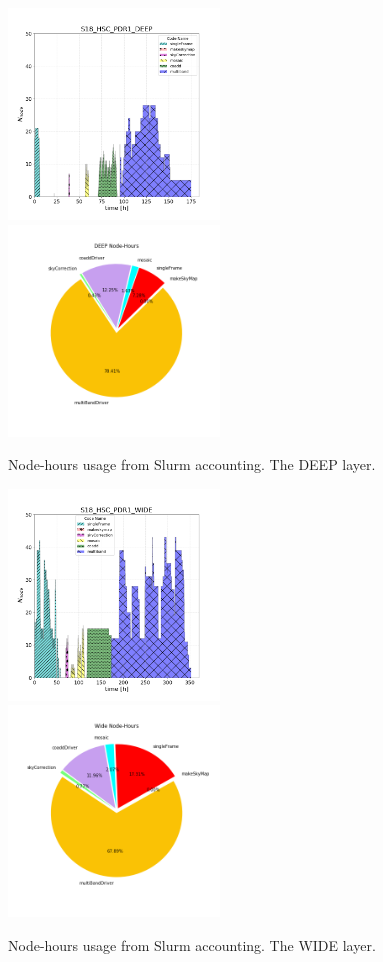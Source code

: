 \begin{figure}[h]
\includegraphics[width=0.50\textwidth]{usage-S18_HSC_PDR1_DEEP.png}
\includegraphics[width=0.50\textwidth]{PDR1_DEEP_pie.png}
\caption{Node-hours usage from Slurm accounting. The DEEP layer.}
\label{figs}
\end{figure}
\begin{figure}[h]
\includegraphics[width=0.50\textwidth]{usage-S18_HSC_PDR1_WIDE.png}
\includegraphics[width=0.50\textwidth]{PDR1_Wide_pie.png}
\caption{Node-hours usage from Slurm accounting. The WIDE layer.}
\label{figs}
\end{figure}
